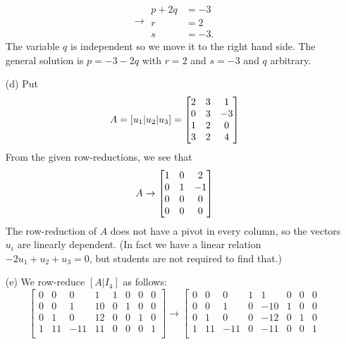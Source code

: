 \documentclass[a4paper]{article}
\begin{document}
\begin{solution}
\begin{itemize}
\[    \to
    \begin{array}{rl}
     p+2q &= -3 \\
     r &= 2 \\
     s &= -3.
    \end{array}
   \]
   The variable $q$ is independent so we move it to the right hand
   side.  The general solution is $p=-3-2q$ with $r=2$ and $s=-3$ and $q$
   arbitrary. \mk
  \item[(d)] Put 
   \[ A = [u_1|u_2|u_3] =
       \left[\begin{matrix}
       2&3&1\\
       0&3&-3\\
       1&2&0\\
       3&2&4\\
       \end{matrix}\right]
   \]
   From the given row-reductions, we see that 
   \[ A \to 
       \left[\begin{matrix}
       1&0&2\\
       0&1&-1\\
       0&0&0\\
       0&0&0\\
       \end{matrix}\right]
   \]
   The row-reduction of $A$ does not have a pivot in every column, so
   the vectors $u_i$ are linearly dependent.   (In fact we have a
   linear relation $-2u_1+u_2+u_3=0$, but students are not required to
   find that.)
  \item[(e)] We row-reduce $[A|I_4]$  as follows:
   \[
    \left[\begin{array}{cccc|cccc}
     0&0&0&1&1&0&0&0\\
     0&0&1&10&0&1&0&0\\
     0&1&0&12&0&0&1&0\\
     1&11&-11&11&0&0&0&1\\
    \end{array}\right]
   \to
    \left[\begin{array}{cccc|cccc}
   0& 0&  0&1&  1&0&0&0\\
   0& 0&  1&0&-10&1&0&0\\
   0& 1&  0&0&-12&0&1&0\\
   1&11&-11&0&-11&0&0&1\\

\end{array}\]
\end{itemize}
\end{solution}
\end{document}
